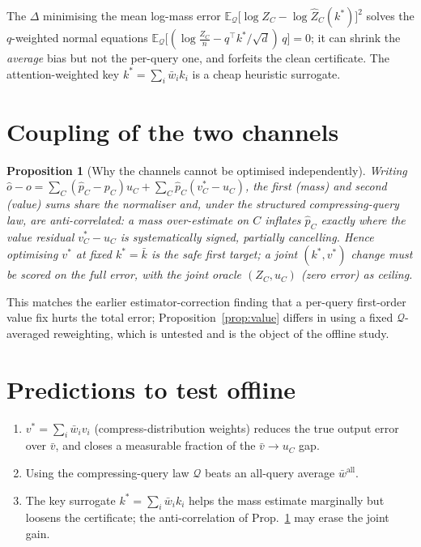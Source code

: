 \documentclass[11pt]{article}
\newtheorem{proposition}{Proposition}
\begin{document}
The $\Delta$ minimising the mean log-mass error $\mathbb E_{\mathcal Q}\big[\log Z_C-\log\hat Z_C(k^\ast)\big]^2$
solves the $q$-weighted normal equations
$\mathbb E_{\mathcal Q}\big[(\log\tfrac{Z_C}{n}-q^\top k^\ast/\sqrt d)\,q\big]=0$; it can shrink
the \emph{average} bias but not the per-query one, and forfeits the clean certificate. The
attention-weighted key $k^\ast=\sum_i\bar w_i k_i$ is a cheap heuristic surrogate.

\section{Coupling of the two channels}

\begin{proposition}[Why the channels cannot be optimised independently]\label{prop:joint}
Writing $\hat o-o=\sum_C(\hat p_C-p_C)u_C+\sum_C\hat p_C(v^\ast_C-u_C)$, the first (mass)
and second (value) sums share the normaliser and, under the structured compressing-query
law, are anti-correlated: a mass over-estimate on $C$ inflates $\hat p_C$ exactly where the
value residual $v^\ast_C-u_C$ is systematically signed, partially cancelling. Hence
optimising $v^\ast$ at fixed $k^\ast=\bar k$ is the safe first target; a joint $(k^\ast,v^\ast)$
change must be scored on the full error, with the joint oracle $(Z_C,u_C)$ (zero error) as
ceiling.
\end{proposition}

This matches the earlier estimator-correction finding that a per-query first-order value
fix hurts the total error; Proposition~\ref{prop:value} differs in using a fixed
$\mathcal Q$-averaged reweighting, which is untested and is the object of the offline study.

\section{Predictions to test offline}
\begin{enumerate}
\item $v^\ast=\sum_i\bar w_i v_i$ (compress-distribution weights) reduces the true output
  error over $\bar v$, and closes a measurable fraction of the $\bar v\!\to\!u_C$ gap.
\item Using the compressing-query law $\mathcal Q$ beats an all-query average $\bar w^{\text{all}}$.
\item The key surrogate $k^\ast=\sum_i\bar w_i k_i$ helps the mass estimate marginally but
  loosens the certificate; the anti-correlation of Prop.~\ref{prop:joint} may erase the
  joint gain.
\end{enumerate}
\end{document}

